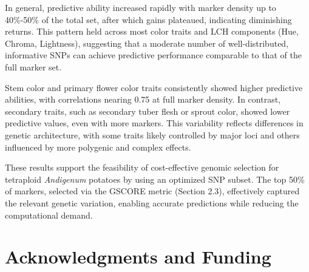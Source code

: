 \documentclass[pdflatex,sn-mathphys-ay]{sn-jnl}%
\begin{document}
In general, predictive ability increased rapidly with marker density up to 40\%-50\% of the total set, after which gains plateaued, indicating diminishing returns. This pattern held across most color traits and LCH components (Hue, Chroma, Lightness), suggesting that a moderate number of well-distributed, informative SNPs can achieve predictive performance comparable to that of the full marker set.

Stem color and primary flower color traits consistently showed higher predictive abilities, with correlations nearing 0.75 at full marker density. In contrast, secondary traits, such as secondary tuber flesh or sprout color, showed lower predictive values, even with more markers. This variability reflects differences in genetic architecture, with some traits likely controlled by major loci and others influenced by more polygenic and complex effects.

These results support the feasibility of cost-effective genomic selection for tetraploid \textit{Andigenum} potatoes by using an optimized SNP subset. The top 50\% of markers, selected via the GSCORE metric (Section 2.3), effectively captured the relevant genetic variation, enabling accurate predictions while reducing the computational demand.












\section{Acknowledgments and Funding}



\end{document}

